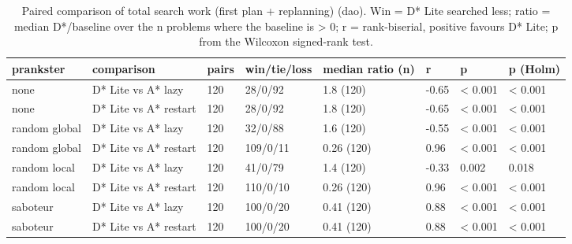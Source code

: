 \begin{table}[t]
\centering
\small
\caption{Paired comparison of total search work (first plan + replanning) (dao). Win = D* Lite searched less; ratio = median D*/baseline over the n problems where the baseline is > 0; r = rank-biserial, positive favours D* Lite; p from the Wilcoxon signed-rank test.}
\label{tab:tests-total-dao}
\begin{tabular}{llllllll}
\toprule
prankster & comparison & pairs & win/tie/loss & median ratio (n) & r & p & p (Holm) \\
\midrule
none & D* Lite vs A* lazy & 120 & 28/0/92 & 1.8 (120) & -0.65 & < 0.001 & < 0.001 \\
none & D* Lite vs A* restart & 120 & 28/0/92 & 1.8 (120) & -0.65 & < 0.001 & < 0.001 \\
random global & D* Lite vs A* lazy & 120 & 32/0/88 & 1.6 (120) & -0.55 & < 0.001 & < 0.001 \\
random global & D* Lite vs A* restart & 120 & 109/0/11 & 0.26 (120) & 0.96 & < 0.001 & < 0.001 \\
random local & D* Lite vs A* lazy & 120 & 41/0/79 & 1.4 (120) & -0.33 & 0.002 & 0.018 \\
random local & D* Lite vs A* restart & 120 & 110/0/10 & 0.26 (120) & 0.96 & < 0.001 & < 0.001 \\
saboteur & D* Lite vs A* lazy & 120 & 100/0/20 & 0.41 (120) & 0.88 & < 0.001 & < 0.001 \\
saboteur & D* Lite vs A* restart & 120 & 100/0/20 & 0.41 (120) & 0.88 & < 0.001 & < 0.001 \\
\bottomrule
\end{tabular}
\end{table}
